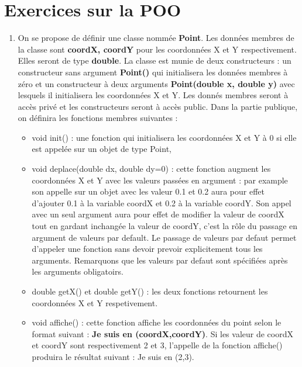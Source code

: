 \documentclass[a4paper, oneside,11pt]{book}
\begin{document}

\section{Exercices sur la POO}
\begin{enumerate}
\item On se propose de d\'efinir une classe nomm\'ee \textbf{Point}. Les donn\'ees membres de la classe sont \textbf{coordX, coordY} pour les coordonn\'ees X et Y respectivement. Elles
seront de type  \textbf{double}. La classe est munie de deux constructeurs : un constructeur sans argument \textbf{Point()} qui initialisera les donn\'ees membres \`a z\'ero 
et un constructeur \`a deux arguments \textbf{Point(double x, double y)} avec lesquels il initialisera les coordonn\'ees X et Y. Les donn\'es membres seront \`a acc\`es priv\'e
et les constructeurs seront \`a acc\`es public. Dans la partie publique, on d\'efinira les fonctions membres suivantes : 
\begin{itemize}
\item void init() : une fonction qui initialisera les coordonn\'ees X et Y \`a 0 si elle est appel\'ee sur un objet de type Point,
\item void deplace(double dx, double dy=0) : cette fonction augment les coordonn\'ees X et Y avec les valeurs pass\'ees en argument : par example son appelle sur un objet avec les 
valeur 0.1 et 0.2 aura pour effet d'ajouter 0.1 \`a la variable coordX et 0.2 \`a la variable coordY. Son appel avec un seul argument aura pour effet de modifier la valeur de coordX
tout en gardant inchang\'ee la valeur de coordY, c'est la r\^ole du passage en argument de valeurs par default. Le passage de valeurs par defaut permet d'appeler une fonction
sans devoir prevoir explicitement tous les arguments. Remarquons que les valeurs par defaut sont sp\'ecifi\'ees apr\`es les arguments obligatoirs.
\item double getX() et double getY() : les deux fonctions retournent les coordonn\'ees X et Y respetivement.
\item void affiche() : cette fonction affiche les coordonn\'ees du point selon le format suivant : \textbf{Je suis en (coordX,coordY)}. Si les valeur de coordX et coordY sont 
respectivement 2 et 3, l'appelle de la fonction affiche() produira le r\'esultat suivant : Je suis en (2,3).
\end{itemize}

\end{enumerate}
\end{document}
